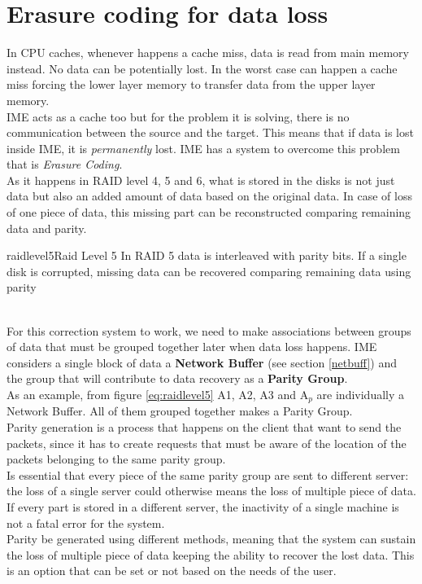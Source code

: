 \section{Erasure coding for data loss} \label{pargroup}
In CPU caches, whenever happens a cache miss, data is read from main memory
instead. No data can be potentially lost. In the worst case can happen a cache
miss forcing the lower layer memory to transfer data from the upper layer
memory. \\
IME acts as a cache too but for the problem it is solving, there is no
communication between the source and the target. This means that if data
is lost inside IME, it is \textit{permanently} lost. IME has a system to
overcome this problem that is \textit{Erasure Coding}. \\
As it happens in RAID level 4, 5 and 6, what is stored in the disks is not just
data but also an added amount of data based on the original data. In case of
loss of one piece of data, this missing part can be reconstructed comparing
remaining data and parity. \\
\begin{myimage}{raidlevel5}{Raid Level 5}
    In RAID 5 data is interleaved with parity bits. If a single disk is
    corrupted, missing data can be recovered comparing remaining data using
    parity
\end{myimage} \\
For this correction system to work, we need to make associations between groups
of data that must be grouped together later when data loss happens. IME
considers a single block of data a \textbf{Network Buffer} (see section \ref{netbuff}) and the
group that will contribute to data recovery as a \textbf{Parity Group}. \\
As an example, from figure \ref{eq:raidlevel5} A1, A2, A3 and A$_p$ are individually a Network
Buffer. All of them grouped together makes a Parity Group. \\
Parity generation is a process that happens on the client that want to send the
packets, since it has to create requests that must be aware of the location of
the packets belonging to the same parity group. \\
Is essential that every piece of the same parity group are sent to
different server: the loss of a single server could otherwise means the loss of
multiple piece of data. If every part is stored in a different server, the
inactivity of a single machine is not a fatal error for the system. \\
Parity be generated using different methods, meaning that the system can sustain
the loss of multiple piece of data keeping the ability to recover the lost data.
This is an option that can be set or not based on the needs of the user.


